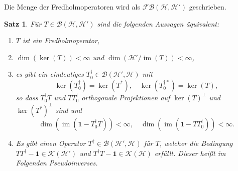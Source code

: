 \documentclass[11pt, hidelinks]{article}
\newcommand{\h}{\mathcal{H}}
\newcommand{\im}{\operatorname{im}}
\numberwithin{conj}{section}
\newtheorem{theorem}[conj]{Satz}
\begin{document}
Die Menge der Fredholmoperatoren wird als $\mathcal{FB}(\h,\h')$ geschrieben.

\begin{theorem}
    \label{fredholm}
    Für $T \in \mathcal{B}(\h,\h')$ sind die folgenden Aussagen äquivalent:
    \begin{enumerate}
        \item $T$ ist ein Fredholmoperator,
        \item $ \dim(\ker(T)) < \infty$ und $\dim(\h' / \im(T)) < \infty$,
        \item es gibt ein eindeutiges $T^\dagger_0 \in \mathcal{B}(\h',\h)$ mit
        \begin{equation}
            \ker(T^\dagger_0) = \ker(T^\ast), \quad \ker(T^{\dagger\ast}_0) = \ker(T),
        \end{equation}
        so dass $T^\dagger_0T$ und $TT^\dagger_0$ orthogonale Projektionen auf $\ker(T)^\perp$ und $\ker(T^\ast)^\perp$ sind und
        \begin{equation}
            \dim(\im(\mathbf{1}-T^\dagger_0T)) < \infty, \quad \dim(\im(\mathbf{1}-TT^\dagger_0)) < \infty.
        \end{equation}
        \item Es gibt einen Operator $T^\dagger\in \mathcal{B}(\h',\h)$ für $T$, welcher die Bedingung $TT^\dagger-\mathbf{1} \in \mathcal{K}(\h')$ und $T^\dagger T-\mathbf{1} \in \mathcal{K}(\h)$ erfüllt. Dieser heißt im Folgenden Pseudoinverses.
    \end{enumerate}
\end{theorem}
\end{document}

